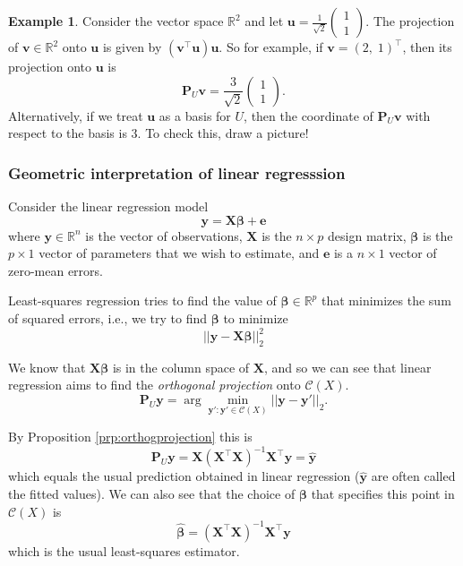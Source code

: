 \documentclass[
]{book}
\theoremstyle{definition}
\theoremstyle{definition}
\newtheorem{example}{Example}[chapter]
\theoremstyle{definition}
\theoremstyle{definition}
\theoremstyle{remark}
\begin{document}
\begin{example}
\protect\hypertarget{exm:proj2}{}\label{exm:proj2}Consider the vector space \(\mathbb{R}^2\) and let \(\mathbf u=\frac{1}{\sqrt{2}}\left(\begin{array}{c}1\\1\end{array}\right)\). The projection of \(\mathbf v\in \mathbb{R}^2\) onto \(\mathbf u\) is given by \((\mathbf v^\top \mathbf u) \mathbf u\). So for example, if \(\mathbf v= (2, \; 1)^\top\), then its projection onto \(\mathbf u\) is
\[\mathbf P_U \mathbf v= \frac{3}{\sqrt{2}}\left(\begin{array}{c}1\\1\end{array}\right).\]
Alternatively, if we treat \(\mathbf u\) as a basis for \(U\), then the coordinate of \(\mathbf P_U \mathbf v\) with respect to the basis is \(3\).
To check this, draw a picture!
\end{example}

\subsubsection{Geometric interpretation of linear regresssion}\label{ch2linreg}

Consider the linear regression model
\[\mathbf y= \mathbf X\boldsymbol \beta+\mathbf e\]
where \(\mathbf y\in\mathbb{R}^n\) is the vector of observations, \(\mathbf X\) is the \(n\times p\) design matrix, \(\boldsymbol \beta\) is the \(p\times 1\) vector of parameters that we wish to estimate, and \(\mathbf e\) is a \(n\times 1\) vector of zero-mean errors.

Least-squares regression tries to find the value of \(\boldsymbol \beta\in \mathbb{R}^p\) that minimizes the sum of squared errors, i.e., we try to find \(\boldsymbol \beta\) to minimize
\[||\mathbf y- \mathbf X\boldsymbol \beta||_2^2\]

We know that \(\mathbf X\boldsymbol \beta\) is in the column space of \(\mathbf X\), and so we can see that linear regression aims to find the \emph{orthogonal projection} onto \(\mathcal{C}(X)\).
\[\mathbf P_U\mathbf y=\arg \min_{\mathbf y': \mathbf y' \in \mathcal{C}(X)} ||\mathbf y-\mathbf y'||_2.\]

By Proposition \ref{prp:orthogprojection} this is
\[\mathbf P_U\mathbf y= \mathbf X(\mathbf X^\top \mathbf X)^{-1}\mathbf X^\top \mathbf y=\hat{\mathbf y}\]
which equals the usual prediction obtained in linear regression (\(\hat{\mathbf y}\) are often called the fitted values). We can also see that the choice of \(\boldsymbol \beta\) that specifies this point in \(\mathcal{C}(X)\) is
\[\hat{\boldsymbol \beta}=(\mathbf X^\top \mathbf X)^{-1}\mathbf X^\top \mathbf y\]
which is the usual least-squares estimator.
\end{document}
